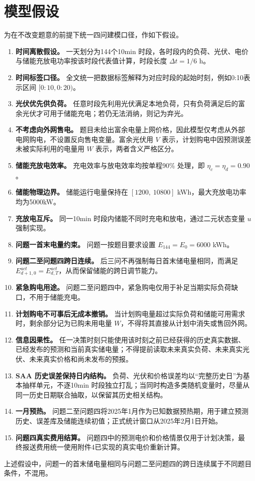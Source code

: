 \section{模型假设}
为在不改变题意的前提下统一四问建模口径，作如下假设。

\begin{enumerate}
\item \textbf{时间离散假设。} 一天划分为144个10min 时段，各时段内的负荷、光伏、电价与储能充放电功率按该时段代表值计算，时段长度 \(\Delta t=1/6\) h。
\item \textbf{时间标签口径。} 全文统一把数据标签解释为对应时段的起始时刻，例如0:10表示区间 \([0{:}10,0{:}20)\)。
\item \textbf{光伏优先供负荷。} 任意时段先利用光伏满足本地负荷，只有负荷满足后的富余光伏才可用于储能充电；若仍无法消纳，则记为弃光。
\item \textbf{不考虑向外网售电。} 题目未给出富余电量上网价格，因此模型仅考虑从外部电网购电，不设置反向售电变量。富余光伏用 \(V\) 表示，计划购电中因预测误差未被实际利用的电量用 \(W\) 表示，两者含义严格区分。
\item \textbf{储能充放电效率。} 充电效率与放电效率均按单程90\% 处理，即 \(\eta_c=\eta_d=0.90\)。
\item \textbf{储能物理边界。} 储能运行电量保持在 \([1200,\ 10800]\) kWh，最大充放电功率均为5000kW。
\item \textbf{充放电互斥。} 同一10min 时段内储能不同时充电和放电，通过二元状态变量 \(u\) 强制实现。
\item \textbf{问题一首末电量约束。} 问题一按题目要求设置 \(E_{144}=E_0=6000\) kWh。
\item \textbf{问题二至问题四跨日连续。} 后三问不再强制每日首末储电量相同，而满足 \(E_{d+1,0}^{act}=E_{d,T}^{act}\)，从而保留储能的跨日调节能力。
\item \textbf{紧急购电用途。} 问题二至问题四中，紧急购电仅用于补足当期实际负荷缺口，不用于储能充电。
\item \textbf{计划购电不可事后无成本撤销。} 当计划购电量超过实际负荷和储能可用需求时，剩余部分记为已购未用电量 \(W\)，不得将其直接从计划中消失或售回外网。
\item \textbf{信息因果性。} 任一决策时刻只能使用该时刻之前已经获得的历史真实数据、已经发布的预测和当前真实储电量；不得提前读取未来真实负荷、未来真实光伏、未来真实价格和尚未发布的预报。
\item \textbf{SAA 历史误差保持日内结构。} 负荷、光伏和价格误差均以“完整历史日”为基本抽样单元，不逐10min 时段独立打乱；当同时构造多类随机变量时，尽量从同一历史日期联合抽取，以保留其历史相关结构。
\item \textbf{一月预热。} 问题二至问题四将2025年1月作为已知数据预热期，用于建立预测历史、误差库及储能连续初值；正式统计窗口从2025年2月1日开始。
\item \textbf{问题四真实费用结算。} 问题四中的预测电价和价格情景仅用于计划决策，最终报送费用统一使用附件4已实现的真实电价重新计算。
\end{enumerate}

上述假设中，问题一的首末储电量相同与问题二至问题四的跨日连续属于不同题目条件，不混用。

